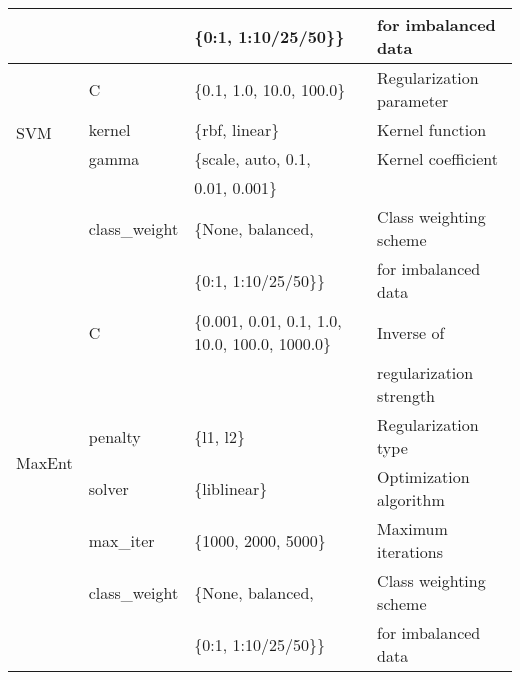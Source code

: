 \documentclass{article}
\begin{document}
\begin{table}[htbp]
\begin{tabular}{llll}
                                    &                         & \{0:1, 1:10/25/50\}\}                          & for imbalanced data      \\
        \midrule
        \multirow{4}{*}{SVM}        & C                       & \{0.1, 1.0, 10.0, 100.0\}                      & Regularization parameter \\
                                    & kernel                  & \{rbf, linear\}                                & Kernel function          \\
                                    & gamma                   & \{scale, auto, 0.1,                            & Kernel coefficient       \\
                                    &                         & 0.01, 0.001\}                                  &                          \\
                                    & class\_weight           & \{None, balanced,                              & Class weighting scheme   \\
                                    &                         & \{0:1, 1:10/25/50\}\}                          & for imbalanced data      \\
        \midrule
        \multirow{6}{*}{MaxEnt}     & C                       & \{0.001, 0.01, 0.1, 1.0, 10.0, 100.0, 1000.0\} & Inverse of               \\
                                    &                         &                                                & regularization strength  \\
                                    & penalty                 & \{l1, l2\}                                     & Regularization type      \\
                                    & solver                  & \{liblinear\}                                  & Optimization algorithm   \\
                                    & max\_iter               & \{1000, 2000, 5000\}                           & Maximum iterations       \\

                                    & class\_weight           & \{None, balanced,                              & Class weighting scheme   \\
                                    &                         & \{0:1, 1:10/25/50\}\}                          & for imbalanced data      \\
        \bottomrule
    \end{tabular}
    \label{tab:hyperparameters}
\end{table}
\end{document}

